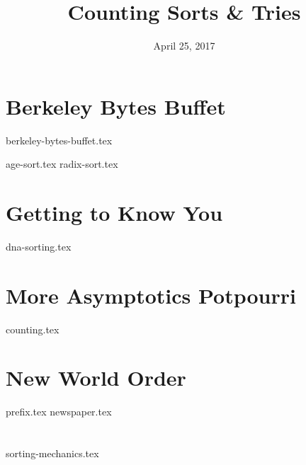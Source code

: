 \documentclass{exam}
\title{Counting Sorts \& Tries}
\date{April 25, 2017}
\begin{document}
\maketitle

\section{Berkeley Bytes Buffet}
{berkeley-bytes-buffet.tex}
\begin{questions}
{age-sort.tex}
{radix-sort.tex}
\end{questions}

\clearpage

\section{Getting to Know You}
\begin{questions}
{dna-sorting.tex}
\end{questions}

\section{More Asymptotics Potpourri}
{counting.tex}

\section{New World Order}
\begin{questions}
{prefix.tex}
{newspaper.tex}
\end{questions}

\clearpage

\section{}
\begin{questions}
{sorting-mechanics.tex}
\end{questions}
\end{document}

